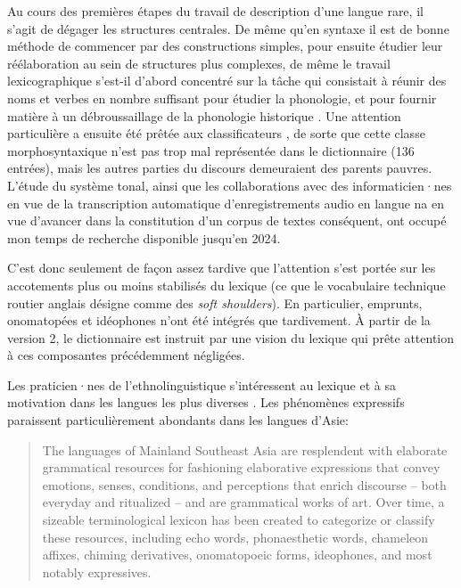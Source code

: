 Au cours des premières étapes du travail de description d'une langue rare, il s'agit de dégager les structures centrales. De même qu'en syntaxe il est de bonne méthode de commencer par des constructions simples, pour ensuite étudier leur réélaboration au sein de structures plus complexes, de même le travail lexicographique s'est-il d'abord concentré sur la tâche qui consistait à réunir des noms et verbes en nombre suffisant pour étudier la phonologie, et pour fournir matière à un débroussaillage de la phonologie historique \parencite{jacquesetal2011}. Une attention particulière a ensuite été prêtée aux classificateurs \parencite{michaud2011c,michaud2013d}, de sorte que cette classe morphosyntaxique n'est pas trop mal représentée dans le dictionnaire (136 entrées), mais les autres parties du discours demeuraient des parents pauvres. L'étude du système tonal, ainsi que les collaborations avec des informaticien·nes en vue de la transcription automatique d'enregistrements audio en langue na \parencite{michaudetal2018integrating,guillaume_plugging_2022} en vue d'avancer dans la constitution d'un corpus de textes conséquent, ont occupé mon temps de recherche disponible jusqu'en 2024.

C'est donc seulement de façon assez tardive que l'attention s'est portée sur les accotements plus ou moins stabilisés du lexique (ce que le vocabulaire technique routier anglais désigne comme des \emph{soft shoulders}). En particulier, emprunts, onomatopées et idéophones n'ont été intégrés que tardivement. À partir de la version 2, le dictionnaire est instruit par une vision du lexique qui prête attention à ces composantes précédemment négligées.

Les praticien·nes de l'ethnolinguistique s'intéressent au lexique et à sa motivation dans les langues les plus diverses \parencite{deColombel2002lexique}. Les phénomènes expressifs paraissent particulièrement abondants dans les langues d'Asie:

\begin{quotation}
    The languages of Mainland Southeast Asia are resplendent with elaborate grammatical resources for fashioning elaborative expressions that convey emotions, senses, conditions, and perceptions that enrich discourse -- both everyday and ritualized -- and are grammatical works of art. Over time, a sizeable terminological lexicon has been created to categorize or classify these resources, including echo words, phonaesthetic words, chameleon affixes, chiming derivatives, onomatopoeic forms, ideophones, and most notably expressives. \parencite[1]{williams_aesthetics_2014}
\end{quotation}

